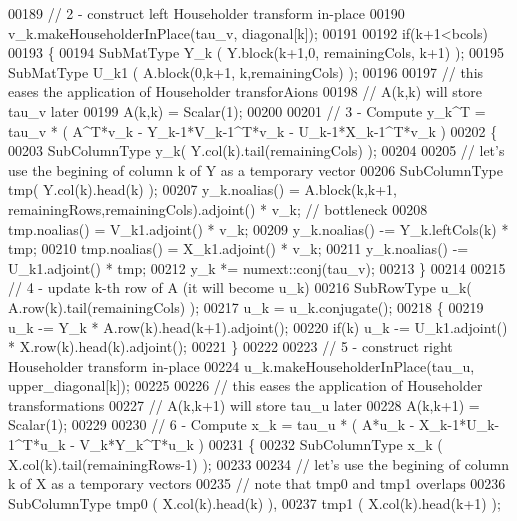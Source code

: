 \begin{DoxyCode}
00189     \textcolor{comment}{// 2 - construct left Householder transform in-place}
00190     v\_k.makeHouseholderInPlace(tau\_v, diagonal[k]);
00191        
00192     \textcolor{keywordflow}{if}(k+1<bcols)
00193     \{
00194       SubMatType Y\_k  ( Y.block(k+1,0, remainingCols, k+1) );
00195       SubMatType U\_k1 ( A.block(0,k+1, k,remainingCols) );
00196       
00197       \textcolor{comment}{// this eases the application of Householder transforAions}
00198       \textcolor{comment}{// A(k,k) will store tau\_v later}
00199       A(k,k) = Scalar(1);
00200 
00201       \textcolor{comment}{// 3 - Compute y\_k^T = tau\_v * ( A^T*v\_k - Y\_k-1*V\_k-1^T*v\_k - U\_k-1*X\_k-1^T*v\_k )}
00202       \{
00203         SubColumnType y\_k( Y.col(k).tail(remainingCols) );
00204         
00205         \textcolor{comment}{// let's use the begining of column k of Y as a temporary vector}
00206         SubColumnType tmp( Y.col(k).head(k) );
00207         y\_k.noalias()  = A.block(k,k+1, remainingRows,remainingCols).adjoint() * v\_k; \textcolor{comment}{// bottleneck}
00208         tmp.noalias()  = V\_k1.adjoint()  * v\_k;
00209         y\_k.noalias() -= Y\_k.leftCols(k) * tmp;
00210         tmp.noalias()  = X\_k1.adjoint()  * v\_k;
00211         y\_k.noalias() -= U\_k1.adjoint()  * tmp;
00212         y\_k *= numext::conj(tau\_v);
00213       \}
00214 
00215       \textcolor{comment}{// 4 - update k-th row of A (it will become u\_k)}
00216       SubRowType u\_k( A.row(k).tail(remainingCols) );
00217       u\_k = u\_k.conjugate();
00218       \{
00219         u\_k -= Y\_k * A.row(k).head(k+1).adjoint();
00220         \textcolor{keywordflow}{if}(k) u\_k -= U\_k1.adjoint() * X.row(k).head(k).adjoint();
00221       \}
00222 
00223       \textcolor{comment}{// 5 - construct right Householder transform in-place}
00224       u\_k.makeHouseholderInPlace(tau\_u, upper\_diagonal[k]);
00225 
00226       \textcolor{comment}{// this eases the application of Householder transformations}
00227       \textcolor{comment}{// A(k,k+1) will store tau\_u later}
00228       A(k,k+1) = Scalar(1);
00229 
00230       \textcolor{comment}{// 6 - Compute x\_k = tau\_u * ( A*u\_k - X\_k-1*U\_k-1^T*u\_k - V\_k*Y\_k^T*u\_k )}
00231       \{
00232         SubColumnType x\_k ( X.col(k).tail(remainingRows-1) );
00233         
00234         \textcolor{comment}{// let's use the begining of column k of X as a temporary vectors}
00235         \textcolor{comment}{// note that tmp0 and tmp1 overlaps}
00236         SubColumnType tmp0 ( X.col(k).head(k) ),
00237                       tmp1 ( X.col(k).head(k+1) );

\end{DoxyCode}
